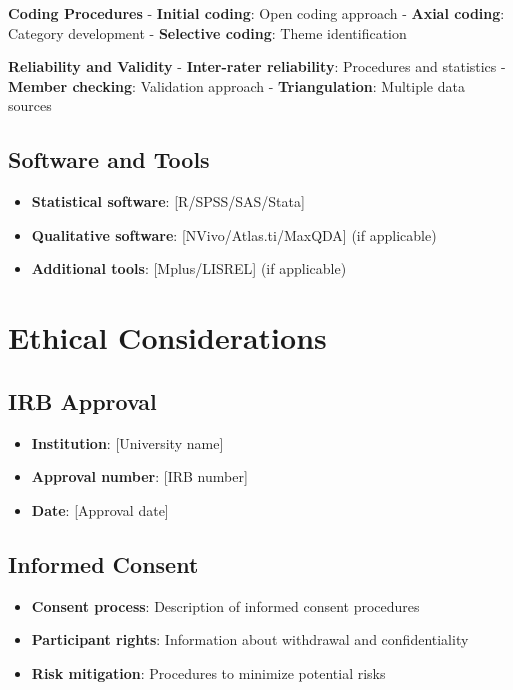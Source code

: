 \documentclass[
  12pt,
  letterpaper,
  12pt,
  letterpaper,
  oneside]{report}
\providecommand{\tightlist}{%
  \setlength{\itemsep}{0pt}\setlength{\parskip}{0pt}}
\begin{document}
\textbf{Coding Procedures} - \textbf{Initial coding}: Open coding
approach - \textbf{Axial coding}: Category development -
\textbf{Selective coding}: Theme identification

\textbf{Reliability and Validity} - \textbf{Inter-rater reliability}:
Procedures and statistics - \textbf{Member checking}: Validation
approach - \textbf{Triangulation}: Multiple data sources

\subsection{Software and Tools}\label{software-and-tools}

\begin{itemize}
\tightlist
\item
  \textbf{Statistical software}: {[}R/SPSS/SAS/Stata{]}
\item
  \textbf{Qualitative software}: {[}NVivo/Atlas.ti/MaxQDA{]} (if
  applicable)
\item
  \textbf{Additional tools}: {[}Mplus/LISREL{]} (if applicable)
\end{itemize}

\section{Ethical Considerations}\label{ethical-considerations}

\subsection{IRB Approval}\label{irb-approval}

\begin{itemize}
\tightlist
\item
  \textbf{Institution}: {[}University name{]}
\item
  \textbf{Approval number}: {[}IRB number{]}
\item
  \textbf{Date}: {[}Approval date{]}
\end{itemize}

\subsection{Informed Consent}\label{informed-consent}

\begin{itemize}
\tightlist
\item
  \textbf{Consent process}: Description of informed consent procedures
\item
  \textbf{Participant rights}: Information about withdrawal and
  confidentiality
\item
  \textbf{Risk mitigation}: Procedures to minimize potential risks
\end{itemize}
\end{document}
